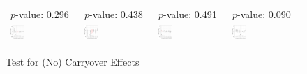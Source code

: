 \documentclass[12pt]{article}
\begin{document}
\begin{figure}[!ht]
\caption{Test for (No) Carryover Effects}\label{fg:carryover}
\centering\scriptsize
\begin{minipage}{1\linewidth}{
\centering
\hspace{1em}
\begin{tabular}{C{3.7cm}C{3.7cm}C{3.7cm}C{3.7cm}}
 \citet{Beazer2022} \newline $p$-value: 0.296 & 
\citet{Blair2022}\newline $p$-value: 0.438 & 
\citet{Bokobza2022} \newline $p$-value: 0.491 &
\citet{Caughey2017} \newline $p$-value: 0.090  \\
  \hspace{-2em} \includegraphics[width = 0.22\textwidth]{figure/carryover/beazer_carryover.png} & 
  \hspace{-2em}  \includegraphics[width = 0.22\textwidth]{figure/carryover/blair_carryover.png} &
  \hspace{-2em}  \includegraphics[width = 0.22\textwidth]{figure/carryover/bokobza_carryover.png} & 
\hspace{-2em} \includegraphics[width = 0.22\textwidth]{figure/carryover/Caughey_carryover.png}  \\

\end{tabular}}
\end{minipage}
\end{figure}
\end{document}
